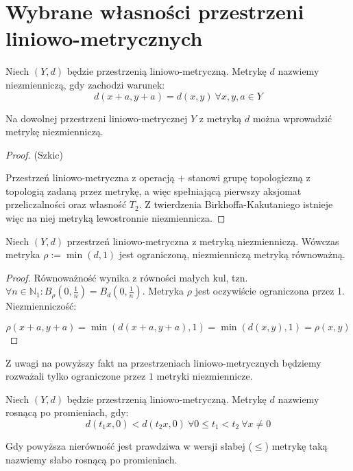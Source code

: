 \section{Wybrane własności przestrzeni liniowo-metrycznych}

\begin{df}
  Niech $(Y, d)$ będzie przestrzenią liniowo-metryczną. Metrykę $d$ nazwiemy niezmienniczą, gdy zachodzi warunek:
  \[d(x+a, y+a) = d(x,y)\ \forall x, y, a \in Y\] 
\end{df}


\begin{fact}
  Na dowolnej przestrzeni liniowo-metrycznej $Y$ z metryką $d$ można wprowadzić metrykę niezmienniczą.
  
  \begin{proof}(Szkic)
  
  Przestrzeń liniowo-metryczna z operacją $+$ stanowi grupę topologiczną z topologią zadaną przez metrykę, a więc spełniającą pierwszy aksjomat przeliczalności oraz własność $T_2$. Z twierdzenia Birkhoffa-Kakutaniego istnieje więc na niej metryką lewostronnie niezmiennicza.
  \end{proof}
\end{fact}

\begin{note}
  Niech $(Y, d)$ przestrzeń liniowo-metryczna z metryką niezmienniczą. Wówczas metryka $\rho := \min(d, 1)$ jest ograniczoną, niezmienniczą metryką równoważną.
  \begin{proof}
    Równoważność wynika z równości małych kul, tzn. $\forall n \in \mathbb{N}_1: B_\rho(0, \frac{1}{n}) = B_d(0, \frac{1}{n})$. Metryka $\rho$ jest oczywiście ograniczona przez 1. Niezmienniczość:
    
    \[\rho(x+a, y+a) = \min(d(x+a, y+a), 1) = \min(d(x,y), 1) = \rho(x,y)\]
  \end{proof}
\end{note}


Z uwagi na powyższy fakt na przestrzeniach liniowo-metrycznych będziemy rozważali tylko ograniczone przez $1$ metryki niezmiennicze.

\begin{df}
  Niech $(Y, d)$ będzie przestrzenią liniowo-metryczną. Metrykę $d$ nazwiemy rosnącą po promieniach, gdy:
  \[d(t_1 x, 0) < d(t_2 x, 0)\ \forall 0 \leq t_1 < t_2\ \forall x \neq 0\]
  
  Gdy powyższa nierówność jest prawdziwa w wersji słabej ($\leq$) metrykę taką nazwiemy słabo rosnącą po promieniach.
\end{df}

